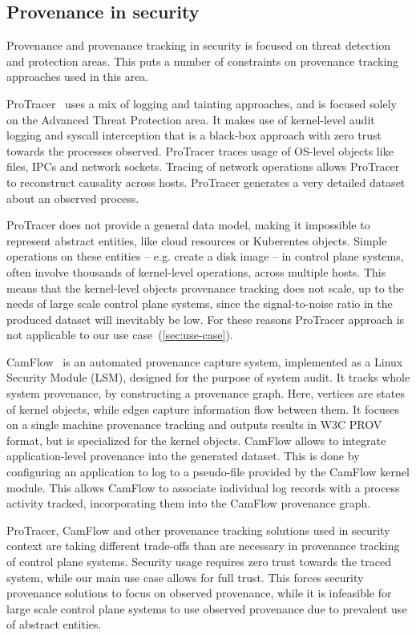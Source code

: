 \subsection{Provenance in security}

Provenance and provenance tracking in security is focused on threat detection and protection areas. This puts a number of constraints on provenance tracking approaches used in this area.

ProTracer~\cite{protracer-ma2016} uses a mix of logging and tainting approaches, and is focused solely on the Advanced Threat Protection area. It makes use of kernel-level audit logging and syscall interception that is a black-box approach with zero trust towards the processes observed. ProTracer traces usage of OS-level objects like files, IPCs and network sockets. Tracing of network operations allows ProTracer to reconstruct causality across hosts. ProTracer generates a very detailed dataset about an observed process.

ProTracer does not provide a general data model, making it impossible to represent abstract entities, like cloud resources or Kuberentes objects. Simple operations on these entities -- e.g. create a disk image -- in control plane systems, often involve thousands of kernel-level operations, across multiple hosts. This means that the kernel-level objects provenance tracking does not scale, up to the needs of large scale control plane systems, since the signal-to-noise ratio in the produced dataset will inevitably be low. For these reasons ProTracer approach is not applicable to our use case~(\cref{sec:use-case}).

CamFlow~\cite{camflow-pasquier-socc2017} is an automated provenance capture system, implemented as a Linux Security Module (LSM), designed for the purpose of system audit. It tracks whole system provenance, by constructing a provenance graph. Here, vertices are states of kernel objects, while edges capture information flow between them. It focuses on a single machine provenance tracking and outputs results in W3C PROV format, but is specialized for the kernel objects. CamFlow allows to integrate application-level provenance into the generated dataset. This is done by configuring an application to log to a pseudo-file provided by the CamFlow kernel module. This allows CamFlow to associate individual log records with a process activity tracked, incorporating them into the CamFlow provenance graph.

ProTracer, CamFlow and other provenance tracking solutions used in security context are taking different trade-offs than are necessary in provenance tracking of control plane systems. Security usage requires zero trust towards the traced system, while our main use case allows for full trust. This forces security provenance solutions to focus on observed provenance, while it is infeasible for large scale control plane systems to use observed provenance due to prevalent use of abstract entities.

